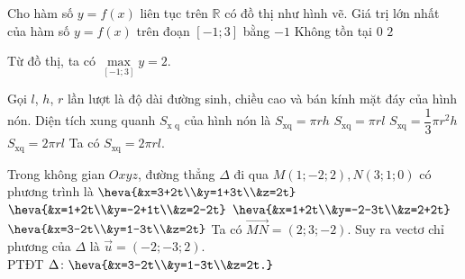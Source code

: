\begin{ex}%
\immini
{
Cho hàm số $y=f(x)$ liên tục trên $\mathbb{R}$ có đồ thị như hình vẽ. Giá trị lớn nhất của hàm số $y=f(x)$ trên đoạn $[-1;3]$ bằng
\choice
{$-1$}
{Không tồn tại}
{$0$}
{\True $2$}
}
{
}
\loigiai
{
Từ đồ thị, ta có $\max\limits_{[-1;3]} y=2$.
}
\end{ex}
\begin{ex}%
Gọi $l$, $h$, $r$ lần lượt là độ dài đường sinh, chiều cao và bán kính mặt đáy của hình nón. Diện tích xung quanh $S_{\text{x q}}$ của hình nón là
\choice
{$S_{\text{xq}}=\pi r h$}
{$S_{\text{xq}}=\pi r l$}
{$S_{\text{xq}}=\dfrac{1}{3}\pi r^2h$}
{\True $S_{\text{xq}}=2\pi r l$}
\loigiai
{
Ta có $S_{\text{xq}}=2\pi r l$.
}
\end{ex}

\begin{ex}%
Trong không gian $O x y z$, đường thẳng $\Delta$ đi qua $M(1;-2;2),N(3;1;0)$ có phương trình là
\choice
{$\heva{&x=3+2t\\&y=1+3t\\&z=2t}$}
{$\heva{&x=1+2t\\&y=-2+1t\\&z=2-2t}$}
{$\heva{&x=1+2t\\&y=-2-3t\\&z=2+2t}$}
{\True $\heva{&x=3-2t\\&y=1-3t\\&z=2t}$}
\loigiai
{
Ta có $\overrightarrow{MN}=(2;3;-2)$. Suy ra vectơ chỉ phương của $\Delta$ là $\overrightarrow{u}=(-2;-3;2)$.\\
PTĐT $\Delta\colon \heva{&x=3-2t\\&y=1-3t\\&z=2t.}$
}
\end{ex}

